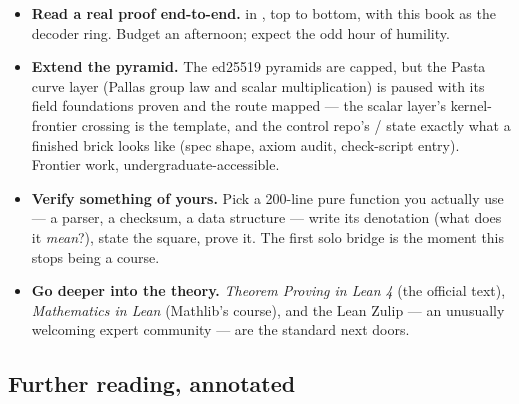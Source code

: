 \begin{itemize}[leftmargin=1.4em]
\item \textbf{Read a real proof end-to-end.}  in
  , top to bottom, with this book as the
  decoder ring. Budget an afternoon; expect the odd hour of humility.
\item \textbf{Extend the pyramid.} The ed25519 pyramids are capped, but
  the Pasta curve layer (Pallas group law and scalar multiplication) is
  paused with its field foundations proven and the route mapped --- the
  scalar layer's kernel-frontier crossing is the template, and the
  control repo's / state exactly what a
  finished brick looks like (spec shape, axiom audit, check-script
  entry). Frontier work, undergraduate-accessible.
\item \textbf{Verify something of yours.} Pick a 200-line pure function you
  actually use --- a parser, a checksum, a data structure --- write its
  denotation (what does it \emph{mean}?), state the square, prove it.
  The first solo bridge is the moment this stops being a course.
\item \textbf{Go deeper into the theory.} \emph{Theorem Proving in Lean 4}
  (the official text), \emph{Mathematics in Lean} (Mathlib's course), and
  the Lean Zulip --- an unusually welcoming expert community --- are the
  standard next doors.
\end{itemize}

\subsection*{Further reading, annotated}


